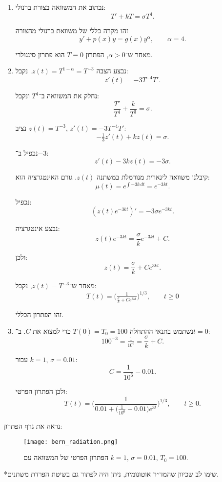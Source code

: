 \documentclass{article}
\numberwithin{equation}{section}
\begin{document}
\begin{enumerate}[label=\alph*.]

\item
נכתוב את המשוואה בצורת ברנולי:
\[
T' + kT = \sigma T^4.
\]

זהו מקרה כללי של משוואת ברנולי מהצורה
\[
y' + p(x) y = g(x) y^\alpha, \qquad \alpha=4.
\]

מאחר ש־$\alpha>0$, הפתרון $T\equiv0$ הוא פתרון סינגולרי.

\item
נבצע הצבה $z(t)=T^{1-\alpha}=T^{-3}$.  
נקבל:
\[
z'(t) = -3 T^{-4}T'.
\]

נחלק את המשוואה ב־$T^4$ ונקבל:
\[
\frac{T'}{T^4} + \frac{k}{T^3} = \sigma.
\]

נציב $z(t)=T^{-3}$, $z'(t)=-3T^{-4}T'$:
\[
-\tfrac{1}{3} z'(t) + kz(t) = \sigma.
\]

נכפיל ב־$-3$:
\[
z'(t) - 3k z(t) = -3\sigma.
\]

קיבלנו משוואה לינארית מנורמלת במשתנה $z(t)$.  
גורם האינטגרציה הוא:
\[
\mu(t) = e^{\int -3k \, dt} = e^{-3kt}.
\]

נכפיל:
\[
(z(t)e^{-3kt})' = -3\sigma e^{-3kt}.
\]

נבצע אינטגרציה:
\[
z(t)e^{-3kt} = \frac{\sigma}{k} e^{-3kt} + C.
\]

ולכן:
\[
z(t) = \frac{\sigma}{k} + C e^{3kt}.
\]

מאחר ש־$z(t)=T^{-3}$, נקבל:
\[
T(t) = \Big(\tfrac{1}{\tfrac{\sigma}{k}+Ce^{3kt}}\Big)^{1/3},\qquad t\geq0
\]

זהו הפתרון הכללי.

\item
נשתמש בתנאי ההתחלה $T(0)=T_0=100$ כדי למצוא את $C$.  
ב־$t=0$:
\[
100^{-3} = \tfrac{1}{10^6} = \frac{\sigma}{k} + C.
\]

עבור $k=1$, $\sigma=0.01$:
\[
C = \frac{1}{10^6} - 0.01.
\]

ולכן הפתרון הפרטי:
\[
\boxed{\, T(t) = \Bigg(\frac{1}{0.01 + \Big(\tfrac{1}{10^6}-0.01\Big)e^{3t}}\Bigg)^{1/3}, \qquad t\geq0. \,}
\]

\end{enumerate}
נראה את גרף הפתרון:
\begin{figure}[H]
    \centering
    \texttt{[image: bern\_radiation.png]}
    \caption{הפתרון הפרטי של המשוואה 
    עם $k=1$, $\sigma=0.01$, $T_0=100$.
    }
    \label{fig:bernoulli_particular}
\end{figure}
*שימו לב שכיוון שהמד׳׳ר אוטונומית, ניתן היה לפתור גם בשיטת הפרדת משתנים.
\end{document}
